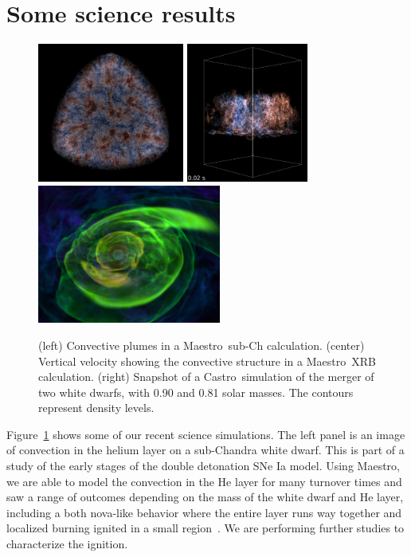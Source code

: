 \documentclass[a4paper]{jpconf}
\newcommand{\maestro}{{\sffamily Maestro}}
\newcommand{\castro}{{\sffamily Castro}}
\begin{document}
\section{Some science results}

\begin{figure}[t]
\centering \includegraphics[height=1.8in]{subch_h}
\includegraphics[height=1.8in]{xrb_compact}
\includegraphics[height=1.8in]{wdmerger_08030_new}
\caption{\label{fig:current-runs} (left) Convective plumes in a
  \maestro\ sub-Ch calculation. (center) Vertical velocity showing the
  convective structure in a \maestro\ XRB calculation. (right)
  Snapshot of a \castro\ simulation of the merger of two white dwarfs,
  with 0.90 and 0.81 solar masses. The contours represent density
  levels.}
\end{figure}

Figure~\ref{fig:current-runs} shows some of our recent science
simulations.  The left panel is an image of convection in the helium
layer on a sub-Chandra white dwarf.  This is part of a study of the
early stages of the double detonation SNe Ia model.  Using \maestro,
we are able to model the convection in the He layer for many turnover
times and saw a range of outcomes depending on the mass of the white
dwarf and He layer, including a both nova-like behavior where the
entire layer runs way together and localized
burning ignited in a small region~\cite{subchandra2}.
We are performing further studies to characterize the ignition.
\end{document}
